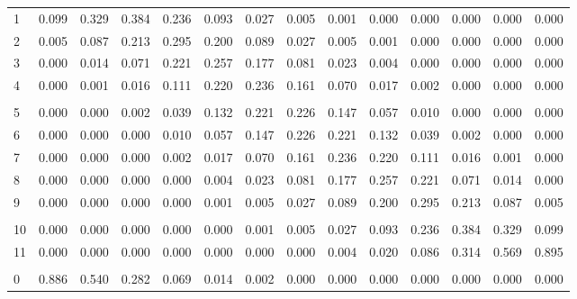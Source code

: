 \documentclass[
]{article}
\begin{document}
\begin{table}[H]
\begin{tabular}{lrrrrrrrrrrrrr}
\hspace{1em}1 & 0.099 & 0.329 & 0.384 & 0.236 & 0.093 & 0.027 & 0.005 & 0.001 & 0.000 & 0.000 & 0.000 & 0.000 & 0.000\\
\hspace{1em}2 & 0.005 & 0.087 & 0.213 & 0.295 & 0.200 & 0.089 & 0.027 & 0.005 & 0.001 & 0.000 & 0.000 & 0.000 & 0.000\\
\hspace{1em}3 & 0.000 & 0.014 & 0.071 & 0.221 & 0.257 & 0.177 & 0.081 & 0.023 & 0.004 & 0.000 & 0.000 & 0.000 & 0.000\\
\hspace{1em}4 & 0.000 & 0.001 & 0.016 & 0.111 & 0.220 & 0.236 & 0.161 & 0.070 & 0.017 & 0.002 & 0.000 & 0.000 & 0.000\\
\addlinespace[-.7em]
\multicolumn{14}{l}{ }\\
\hspace{1em}5 & 0.000 & 0.000 & 0.002 & 0.039 & 0.132 & 0.221 & 0.226 & 0.147 & 0.057 & 0.010 & 0.000 & 0.000 & 0.000\\
\hspace{1em}6 & 0.000 & 0.000 & 0.000 & 0.010 & 0.057 & 0.147 & 0.226 & 0.221 & 0.132 & 0.039 & 0.002 & 0.000 & 0.000\\
\hspace{1em}7 & 0.000 & 0.000 & 0.000 & 0.002 & 0.017 & 0.070 & 0.161 & 0.236 & 0.220 & 0.111 & 0.016 & 0.001 & 0.000\\
\hspace{1em}8 & 0.000 & 0.000 & 0.000 & 0.000 & 0.004 & 0.023 & 0.081 & 0.177 & 0.257 & 0.221 & 0.071 & 0.014 & 0.000\\
\hspace{1em}9 & 0.000 & 0.000 & 0.000 & 0.000 & 0.001 & 0.005 & 0.027 & 0.089 & 0.200 & 0.295 & 0.213 & 0.087 & 0.005\\
\addlinespace[-.7em]
\multicolumn{14}{l}{ }\\
\hspace{1em}10 & 0.000 & 0.000 & 0.000 & 0.000 & 0.000 & 0.001 & 0.005 & 0.027 & 0.093 & 0.236 & 0.384 & 0.329 & 0.099\\
\hspace{1em}11 & 0.000 & 0.000 & 0.000 & 0.000 & 0.000 & 0.000 & 0.000 & 0.004 & 0.020 & 0.086 & 0.314 & 0.569 & 0.895\\
\addlinespace[0.3em]
\multicolumn{14}{l}{$n=12$}\\
\hspace{1em}0 & 0.886 & 0.540 & 0.282 & 0.069 & 0.014 & 0.002 & 0.000 & 0.000 & 0.000 & 0.000 & 0.000 & 0.000 & 0.000\\

\end{tabular}
\end{table}
\end{document}
